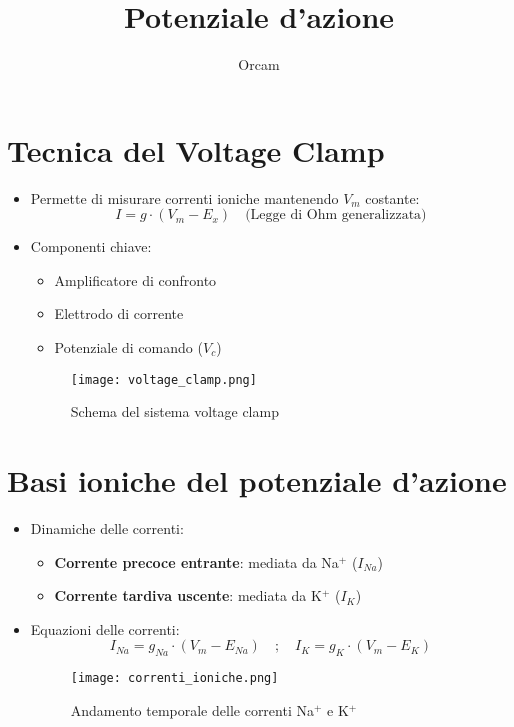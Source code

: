 \documentclass{article}
\title{Potenziale d'azione}
\author{Orcam}
\date{}
\begin{document}
\maketitle

\section{Tecnica del Voltage Clamp}
\begin{itemize}
\item Permette di misurare correnti ioniche mantenendo \( V_m \) costante:
\[
I = g \cdot (V_m - E_x) \quad \text{(Legge di Ohm generalizzata)}
\]

\item Componenti chiave:
  \begin{itemize}
  \item Amplificatore di confronto
  \item Elettrodo di corrente
  \item Potenziale di comando (\( V_c \))
  \end{itemize}

\begin{figure}[h]
\centering
\texttt{[image: voltage\_clamp.png]}
\caption{Schema del sistema voltage clamp}
\label{fig:clamp}
\end{figure}
\end{itemize}

\section{Basi ioniche del potenziale d'azione}
\begin{itemize}
\item Dinamiche delle correnti:
  \begin{itemize}
  \item \textbf{Corrente precoce entrante}: mediata da Na\(^+\) (\( I_{Na} \))
  \item \textbf{Corrente tardiva uscente}: mediata da K\(^+\) (\( I_K \))
  \end{itemize}

\item Equazioni delle correnti:
\[
I_{Na} = g_{Na} \cdot (V_m - E_{Na}) \quad;\quad I_K = g_K \cdot (V_m - E_K)
\]

\begin{figure}[h]
\centering
\texttt{[image: correnti\_ioniche.png]}
\caption{Andamento temporale delle correnti Na\(^+\) e K\(^+\)}
\label{fig:correnti}
\end{figure}
\end{itemize}
\end{document}

